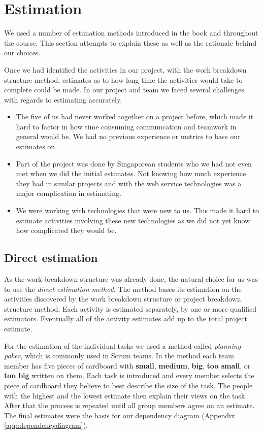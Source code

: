 \section{Estimation}
\label{sec:EmpiriEstimation}

We used a number of estimation methods introduced in the book \cite{caye} and throughout the
course. This section attempts to explain these as well as the rationale behind our choices.

Once we had identified the activities in our project, with the work breakdown structure method,
estimates as to how long time the activities would take to complete could be made. In our project
and team we faced several challenges with regards to estimating accurately.

\begin{itemize}
\item The five of us had never worked together on a project before, which made it hard to factor
    in how time consuming communcation and teamwork in general would be. We had no previous experience
    or metrics to base our estimates on.
    
\item Part of the project was done by Singaporean students who we had not even met when we did the
    initial estimates. Not knowing how much experience they had in similar projects and with the web
    service technologies was a major complication in estimating.
    
\item We were working with technologies that were new to us. This made it hard to estimate activities
    involving these new technologies as we did not yet know how complicated they would be.
\end{itemize}

\subsection{Direct estimation}

As the work breakdown structure was already done, the natural choice for us was to use the \emph{direct
estimation method}\cite{caye}. The method bases its estimation on the activities discovered by the work
breakdown structure or project breakdown structure method. Each activity is  estimated separately, by
one or more qualified estimators. Eventually all of the activity estimates add up to the total project
estimate. 

For the estimation of the individual tasks we used a method called \emph{planning poker}, which is commonly
used in Scrum teams. In the method each team member has five pieces of cardboard with \textbf{small},
\textbf{medium}, \textbf{big}, \textbf{too small}, or \textbf{too big} written on them. Each task is
introduced and every member selects the piece of cardboard they believe to best describe the size of the task.
The people with the highest and the lowest estimate then explain their views on the task. After that the
process is repeated until all group members agree on an estimate. The final estimates were the basis for our
dependency diagram (Appendix \ref{app:dependencydiagram}).

